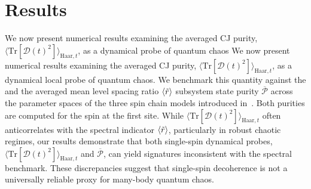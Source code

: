 \documentclass[letterpaper,superscriptaddress,aps,pra,nolongbibliography,showpacs,floatfix,dvipsnames,10pt,twocolumn]{revtex4-2}
\newcommand{\choip}{\langle \text{Tr}[\mathcal{D}(t)^2] \rangle_{\mathrm{Haar}, t}}
\newcommand{\statep}{\overline{\mathcal{P}}}
\begin{document}
\section{Results}\label{sec:results}
We now present numerical results examining the averaged
CJ purity, $\choip$, as a dynamical probe
of quantum chaos 
We now present numerical results examining the averaged CJ purity, 
$\choip$, as a dynamical local probe of quantum chaos.
We benchmark this quantity against the and the averaged
mean level spacing ratio $\expval{\tilde{r}}$
subsystem state purity $\statep$ across the parameter spaces of
the three spin chain models introduced in~.
Both purities are computed for the spin at the first site.
While $\choip$ often anticorrelates with the
spectral indicator $\expval{\tilde{r}}$, particularly in robust
chaotic regimes, our results demonstrate that both single-spin
dynamical probes, $\choip$ and $\statep$, can yield signatures
inconsistent with the spectral benchmark. These discrepancies
suggest that single-spin decoherence is not a universally
reliable proxy for many-body quantum chaos. 
\end{document}
